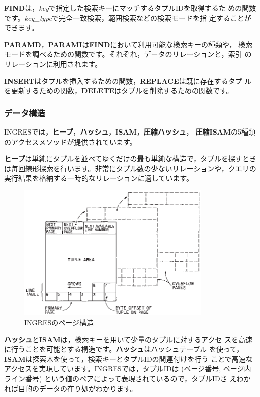 {\bf FIND}は，{\it key}で指定した検索キーにマッチするタプルIDを取得するた
めの関数です。{\it key\_type}で完全一致検索，範囲検索などの検索モードを指
定することができます。


{\bf PARAMD}，{\bf PARAMI}は{\bf FIND}において利用可能な検索キーの種類や，
検索モードを調べるための関数です。それぞれ，データのリレーションと，索引
のリレーションに利用されます。


{\bf INSERT}はタプルを挿入するための関数，{\bf REPLACE}は既に存在するタプ
ルを更新するための関数，{\bf DELETE}はタプルを削除するための関数です。


\subsubsection{データ構造}


INGRESでは，{\bf ヒープ}，{\bf ハッシュ}，{\bf ISAM}，{\bf 圧縮ハッシュ}，
{\bf 圧縮ISAM}の5種類のアクセスメソッドが提供されています。


{\bf ヒープ}は単純にタプルを並べてゆくだけの最も単純な構造で，タプルを探すとき
は毎回線形探索を行います。非常にタプル数の少ないリレーションや，クエリの
実行結果を格納する一時的なリレーションに適しています。


\begin{figure}[tb]
 \begin{center}
  \includegraphics[height=66mm]{hayamiz/images/page-layout-ingres.eps}
  \caption{INGRESのページ構造}
  \label{174456_16Jul12}
 \end{center}
\end{figure}


{\bf ハッシュ}と{\bf ISAM}は，検索キーを用いて少量のタプルに対するアクセ
スを高速に行うことを可能とする構造です。{\bf ハッシュ}はハッシュテーブル
を使って，{\bf ISAM}は探索木を使って，検索キーとタプルIDの関連付けを行う
ことで高速なアクセスを実現しています。INGRESでは，タプルIDは (ページ番号,
ページ内ライン番号) という値のペアによって表現されているので，タプルIDさ
えわかれば目的のデータの在り処がわかります。


